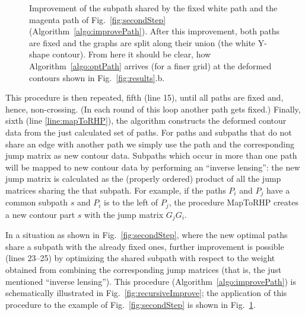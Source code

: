 \documentclass[reqno]{amsart}
\begin{document}
\begin{figure}[tbp]
	\caption{Improvement of the subpath shared by the fixed white path and the magenta path of Fig.~\ref{fig:secondStep}
	(Algorithm~\ref{algo:improvePath}). After this improvement, both paths are fixed and the graphs are split along their union (the white Y-shape contour). From here it should be clear, how Algorithm~\ref{algo:optPath}
	arrives (for a finer grid) at the deformed contours shown in Fig.~\ref{fig:results}.b.}\label{fig:thirdStep}
\end{figure}


This procedure is then repeated, fifth (line 15), until all paths are fixed and, hence, non-crossing. (In each round of this loop another path  gets fixed.) Finally, sixth (line \ref{line:mapToRHP}),
the algorithm constructs the deformed contour data from the just calculated set of paths. 
For paths and subpaths that do not share an edge with another path we simply use the path and the corresponding jump matrix as new contour data. Subpaths which occur in more than one path will be mapped to new contour data
by performing an ``inverse lensing'': the new jump matrix is calculated as the (properly ordered) product of all the jump matrices sharing the that subpath. For example, if the paths $P_i$ and $P_j$ have a common subpath $s$ and $P_i$ is to the left of $P_j$, the procedure {\sc MapToRHP} creates a new contour part $s$ with the jump matrix $G_j G_i$.

In a situation as shown in Fig.~\ref{fig:secondStep}, where the new optimal paths share a subpath with
the already fixed ones, further improvement is possible (lines 23--25) by optimizing the shared subpath with respect
to the weight obtained from combining the corresponding jump matrices (that is, the just mentioned ``inverse lensing''). This procedure (Algorithm~\ref{algo:improvePath}) is schematically illustrated in Fig.~\ref{fig:recursiveImprove}; the application of this procedure to the example of Fig.~\ref{fig:secondStep} is shown in Fig.~\ref{fig:thirdStep}.
\end{document}
